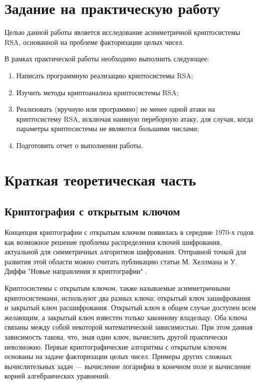 \section{Задание на практическую работу}
Целью данной работы является исследование асимметричной криптосистемы RSA, основанной на проблеме факторизации целых чисел.

В рамках практической работы необходимо выполнить следующее:
\begin{enumerate}
    \item Написать программную реализацию криптосистемы RSA;
    \item Изучить методы криптоанализа криптосистемы RSA;
    \item Реализовать (вручную или программно) не менее одной атаки на криптосистему RSA, исключая наивную переборную атаку, для случая, когда параметры криптосистемы не являются большими числами;
    \item Подготовить отчет о выполнении работы.
\end{enumerate}
\newpage




\section{Краткая теоретическая часть}
\subsection{Криптография с открытым ключом}
Концепция криптографии с открытым ключом появилась в середине 1970-х годов как возможное решение проблемы распределения ключей шифрования, актуальной для симметричных алгоритмов шифрования. Отправной точкой для развития этой области можно считать публикацию статьи М. Хеллмана и У. Диффи "Новые направления в криптографии" \cite{crypto:dh}. 

Криптосистемы с открытым ключом, также называемые асимметричными криптосистемами, используют два разных ключа: открытый ключ зашифрования и закрытый ключ расшифрования. Открытый ключ в общем случае доступен всем желающим, а закрытый ключ известен только законному владельцу. Оба ключа связаны между собой некоторой математической зависимостью. При этом данная зависимость такова, что, зная один ключ, вычислить другой практически невозможно.
Первые криптографические алгоритмы с открытым ключом основаны на задаче факторизации целых чисел. Примеры других сложных вычислительных задач — вычисление логарифма в конечном поле и вычисление корней алгебраических уравнений.

